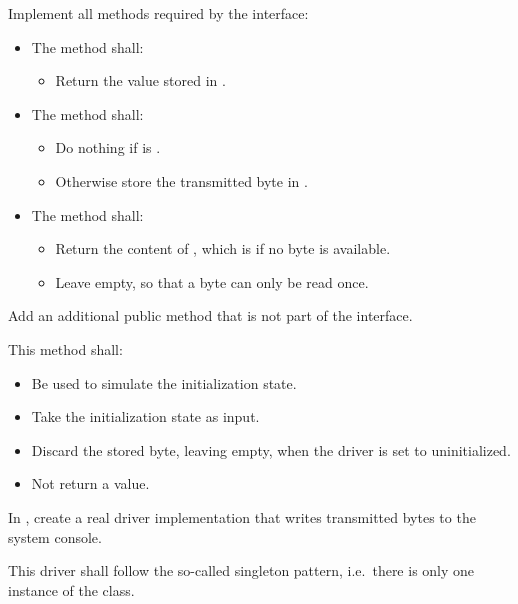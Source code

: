 Implement all methods required by the interface:
\begin{itemize}
  \item The method  shall:
  \begin{itemize}
    \item Return the value stored in .
  \end{itemize}
  \item The method  shall:
  \begin{itemize}
    \item Do nothing if  is .
    \item Otherwise store the transmitted byte in .
  \end{itemize}
  \item The method  shall:
  \begin{itemize}
    \item Return the content of , which is  if no byte is
      available.
    \item Leave  empty, so that a byte can only be read once.
  \end{itemize}
\end{itemize}

Add an additional public method  that is not part of the interface.

This method shall:
\begin{itemize}
  \item Be used to simulate the initialization state.
  \item Take the initialization state as input.
  \item Discard the stored byte, leaving  empty, when the driver is set to
    uninitialized.
  \item Not return a value.
\end{itemize}

\label{c3:set:3}

\label{c3:ex:3.1}
In , create a real driver implementation
 that writes transmitted bytes to the system console.

This driver shall follow the so-called singleton pattern, i.e.\ there is only one instance of the
class.

